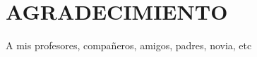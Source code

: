 \chapter*{\flushright AGRADECIMIENTO}
\doublespacing
\begin{flushright}
       A mis profesores, compañeros, amigos, padres, novia, etc
\end{flushright}
